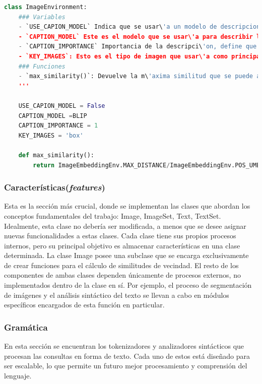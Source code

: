 \begin{lstlisting}[language=Python]
class ImageEnvironment:
    ### Variables 
    - `USE_CAPION_MODEL` Indica que se usar\'a un modelo de descripciones de im\'agenes
    - `CAPTION_MODEL` Este es el modelo que se usar\'a para describir la im\'agen
    - `CAPTION_IMPORTANCE` Importancia de la descripci\'on, define que tan importante ser la descripci\'on de una imagen para la similitud. Valor=1 indica que tiene igual importancia que la imagen.
    - `KEY_IMAGES`: Esto es el tipo de imagen que usar\'a como principal. (box or mask).
    ### Funciones
    - `max_similarity()`: Devuelve la m\'axima similitud que se puede alcanzar en la distancia entre dos im\'agenes. 
    '''

    USE_CAPION_MODEL = False
    CAPTION_MODEL =BLIP
    CAPTION_IMPORTANCE = 1
    KEY_IMAGES = 'box'

    def max_similarity():
        return ImageEmbeddingEnv.MAX_DISTANCE/ImageEmbeddingEnv.POS_UMBRAL

\end{lstlisting}

\subsubsection{Caracter\'isticas(\textit{features})}
Esta es la sección m\'as crucial, donde se implementan las clases que abordan los conceptos fundamentales del trabajo: Image, ImageSet, Text, TextSet. Idealmente, esta clase no debería ser modificada, a menos que se desee asignar nuevas funcionalidades a estas clases. Cada clase tiene sus propios procesos internos, pero su principal objetivo es almacenar características en una clase determinada. 
La clase Image posee una subclase que se encarga exclusivamente de crear funciones para el c\'alculo de similitudes de vecindad. El resto de los componentes de ambas clases dependen únicamente de procesos externos, no implementados dentro de la clase en sí. Por ejemplo, el proceso de segmentación de im\'agenes y el an\'alisis sint\'actico del texto se llevan a cabo en módulos específicos encargados de esta función en particular.

\subsubsection{Gram\'atica}
En esta sección se encuentran los tokenizadores y analizadores sint\'acticos que procesan las consultas en forma de texto. Cada uno de estos est\'a diseñado para ser escalable, lo que permite un futuro mejor procesamiento y comprensión del lenguaje.

